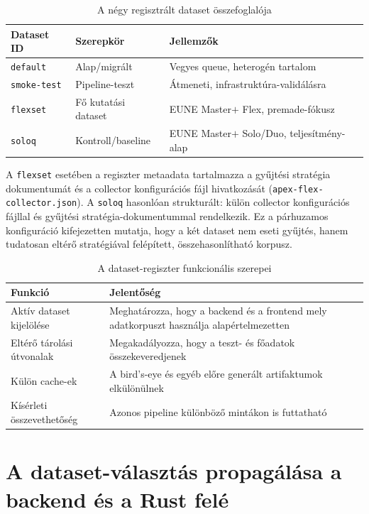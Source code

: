 \begin{table}[H]
\centering
\caption{A négy regisztrált dataset összefoglalója}
\begin{tabularx}{\textwidth}{>{\raggedright\arraybackslash}p{3.0cm} >{\raggedright\arraybackslash}p{3.0cm} X}
\toprule
\textbf{Dataset ID} & \textbf{Szerepkör} & \textbf{Jellemzők} \\
\midrule
\texttt{default} & Alap/migrált & Vegyes queue, heterogén tartalom \\
\texttt{smoke-test} & Pipeline-teszt & Átmeneti, infrastruktúra-validálásra \\
\texttt{flexset} & Fő kutatási dataset & EUNE Master$+$ Flex, premade-fókusz \\
\texttt{soloq} & Kontroll/baseline & EUNE Master$+$ Solo/Duo, teljesítmény-alap \\
\bottomrule
\end{tabularx}
\end{table}

A \texttt{flexset} esetében a regiszter metaadata tartalmazza a gyűjtési stratégia dokumentumát és a collector konfigurációs fájl hivatkozását (\texttt{apex\allowbreak-flex\allowbreak-collector.json}). A \texttt{soloq} hasonlóan strukturált: külön collector konfigurációs fájllal és gyűjtési stratégia-dokumentummal rendelkezik. Ez a párhuzamos konfiguráció kifejezetten mutatja, hogy a két dataset nem eseti gyűjtés, hanem tudatosan eltérő stratégiával felépített, összehasonlítható korpusz.

\begin{table}[H]
\centering
\caption{A dataset-regiszter funkcionális szerepei}
\begin{tabularx}{\textwidth}{>{\raggedright\arraybackslash}p{4.2cm}X}
\toprule
\textbf{Funkció} & \textbf{Jelentőség} \\
\midrule
Aktív dataset kijelölése & Meghatározza, hogy a backend és a frontend mely adatkorpuszt használja alapértelmezetten \\
Eltérő tárolási útvonalak & Megakadályozza, hogy a teszt- és főadatok összekeveredjenek \\
Külön cache-ek & A bird's-eye és egyéb előre generált artifaktumok elkülönülnek \\
Kísérleti összevethetőség & Azonos pipeline különböző mintákon is futtatható \\
\bottomrule
\end{tabularx}
\end{table}

\section{A dataset-választás propagálása a backend és a Rust felé}

